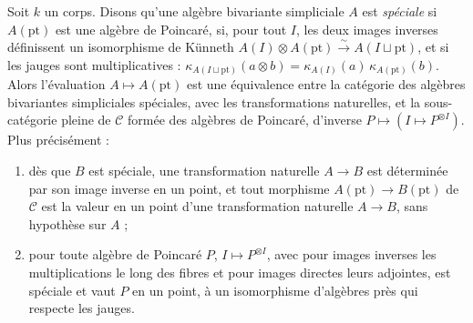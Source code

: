 \begin{encadre}
\begin{theoreme}
Soit $k$ un corps. Disons qu'une algèbre bivariante simpliciale $A$ est \emph{spéciale} si $A(\mathrm{pt})$ est une algèbre de Poincaré, si, pour tout $I$, les deux images inverses définissent un isomorphisme de Künneth $A(I) \otimes A(\mathrm{pt}) \xrightarrow{\sim} A(I \sqcup \mathrm{pt})$, et si les jauges sont multiplicatives : $\kappa_{A(I \sqcup \mathrm{pt})}(a \otimes b) = \kappa_{A(I)}(a)\,\kappa_{A(\mathrm{pt})}(b)$. Alors l'évaluation $A \mapsto A(\mathrm{pt})$ est une équivalence entre la catégorie des algèbres bivariantes simpliciales spéciales, avec les transformations naturelles, et la sous-catégorie pleine de $\mathcal{C}$ formée des algèbres de Poincaré, d'inverse $P \mapsto (I \mapsto P^{\otimes I})$. Plus précisément :
\begin{enumerate}
\item dès que $B$ est spéciale, une transformation naturelle $A \to B$ est déterminée par son image inverse en un point, et tout morphisme $A(\mathrm{pt}) \to B(\mathrm{pt})$ de $\mathcal{C}$ est la valeur en un point d'une transformation naturelle $A \to B$, sans hypothèse sur $A$ ;
\item pour toute algèbre de Poincaré $P$, $I \mapsto P^{\otimes I}$, avec pour images inverses les multiplications le long des fibres et pour images directes leurs adjointes, est spéciale et vaut $P$ en un point, à un isomorphisme d'algèbres près qui respecte les jauges.
\end{enumerate}
\end{theoreme}
\end{encadre}

